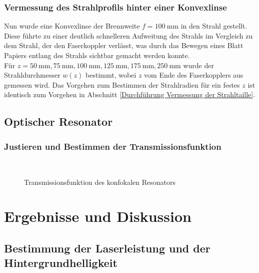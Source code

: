 \documentclass[11pt,a4paper,oneside]{scrartcl}
\begin{document}
\subsubsection{Vermessung des Strahlprofils hinter einer Konvexlinse}
Nun wurde eine Konvexlinse der Brennweite $f=100\ \mathrm{mm}$ in den Strahl gestellt. Diese führte zu einer deutlich schnelleren Aufweitung des Strahls im Vergleich zu dem Strahl, der den Faserkoppler verlässt, was durch das Bewegen eines Blatt Papiers entlang des Strahls sichtbar gemacht werden konnte. \\
Für $z=50\ \mathrm{mm},75\ \mathrm{mm},100\ \mathrm{mm},125\ \mathrm{mm},175\ \mathrm{mm}, 250\ \mathrm{mm}$ wurde der Strahldurchmesser $w(z)$ bestimmt, wobei $z$ vom Ende des Faserkopplers aus gemessen wird. Das Vorgehen zum Bestimmen der Strahlradien für ein festes $z$ ist identisch zum Vorgehen in Abschnitt \ref{Durchführung Vermessung der Strahltaille}.
\subsection{Optischer Resonator}

\subsubsection{Justieren und Bestimmen der Transmissionsfunktion}
\begin{figure}[H]

    \centering
  \\
   \caption{Transmissionsfunktion des konfokalen Resonators}
    \label{FotostreckeTransmissionsfunktion}
\end{figure}

\section{Ergebnisse und Diskussion}
\subsection{Bestimmung der Laserleistung und der Hintergrundhelligkeit}
\end{document}
